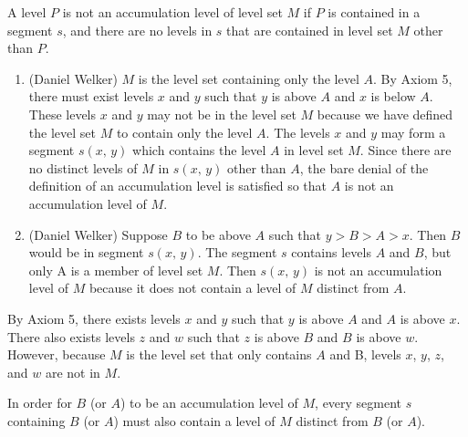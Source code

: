 \documentclass[12pt]{article}
\begin{document}
\problem
{}
A level $P$ is not an accumulation level of level set $M$ if $P$ is contained in a segment $s$, and there are no levels in $s$ that are contained in level set $M$ other than $P$.


\problem
\solutionAlt
\begin{enumerate}
    \item (Daniel Welker) $M$ is the level set containing only the level $A$. By Axiom 5, there must exist levels $x$ and $y$ such that $y$ is above $A$ and $x$ is below $A$. These levels $x$ and $y$ may not be in the level set $M$ because we have defined the level set $M$ to contain only the level $A$. The levels $x$ and $y$ may form a segment $s(x,\,y)$ which contains the level $A$ in level set $M$. Since there are no distinct levels of $M$ in $s(x,\,y)$ other than $A$, the bare denial of the definition of an accumulation level is satisfied so that $A$ is not an accumulation level of $M$.
    \item (Daniel Welker) Suppose $B$ to be above $A$ such that $y > B > A > x$. Then $B$ would be in segment $s(x,\,y)$. The segment $s$ contains levels $A$ and $B$, but only $ $A is a member of level set $M$. Then $s(x,\,y)$ is not an accumulation level of $M$ because it does not contain a level of $M$ distinct from $A$.
\end{enumerate}

\problem
{}
By Axiom 5, there exists levels $x$ and $y$ such that $y$ is above $A$ and $A$ is above $x$. There also exists levels $z$ and $w$ such that $z$ is above $B$ and $B$ is above $w$. However, because $M$ is the level set that only contains $A$ and $ $B, levels $x$, $y$, $z$, and $w$ are not in $M$.

In order for $B$ (or $A$) to be an accumulation level of $M$, every segment $s$ containing $B$ (or $A$) must also contain a level of $M$ distinct from $B$ (or $A$).
\end{document}
